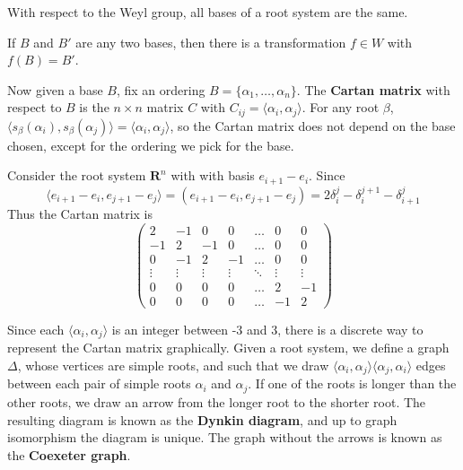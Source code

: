 With respect to the Weyl group, all bases of a root system are the same.

\begin{theorem}
    If $B$ and $B'$ are any two bases, then there is a transformation $f \in W$ with $f(B) = B'$.
\end{theorem}

Now given a base $B$, fix an ordering $B = \{ \alpha_1, \dots, \alpha_n \}$. The {\bf Cartan matrix} with respect to $B$ is the $n \times n$ matrix $C$ with $C_{ij} = \langle \alpha_i, \alpha_j \rangle$. For any root $\beta$, $\langle s_\beta(\alpha_i), s_\beta(\alpha_j) \rangle = \langle \alpha_i, \alpha_j \rangle$, so the Cartan matrix does not depend on the base chosen, except for the ordering we pick for the base.

\begin{example}
    Consider the root system $\mathbf{R}^n$ with with basis $e_{i+1} - e_i$. Since
    \[ \langle e_{i+1} - e_i, e_{j+1} - e_j \rangle = (e_{i+1} - e_i, e_{j+1} - e_j) = 2 \delta_i^j - \delta_i^{j+1} - \delta_{i+1}^j \]
    Thus the Cartan matrix is
    \[ \begin{pmatrix} 2 & -1 & 0 & 0 & \dots & 0 & 0\\
                      -1 & 2 & -1 & 0 & \dots & 0 & 0\\
                       0 & -1 & 2 & -1 & \dots & 0 & 0 \\
                       \vdots & \vdots & \vdots & \vdots & \ddots & \vdots & \vdots\\
                       0 & 0 & 0 & 0 & \dots & 2 & -1\\
                       0 & 0 & 0 & 0 & \dots & -1 & 2\end{pmatrix} \]
\end{example}

Since each $\langle \alpha_i, \alpha_j \rangle$ is an integer between -3 and 3, there is a discrete way to represent the Cartan matrix graphically. Given a root system, we define a graph $\Delta$, whose vertices are simple roots, and such that we draw $\langle \alpha_i, \alpha_j \rangle \langle \alpha_j, \alpha_i \rangle$ edges between each pair of simple roots $\alpha_i$ and $\alpha_j$. If one of the roots is longer than the other roots, we draw an arrow from the longer root to the shorter root. The resulting diagram is known as the {\bf Dynkin diagram}, and up to graph isomorphism  the diagram is unique. The graph without the arrows is known as the {\bf Coexeter graph}.

